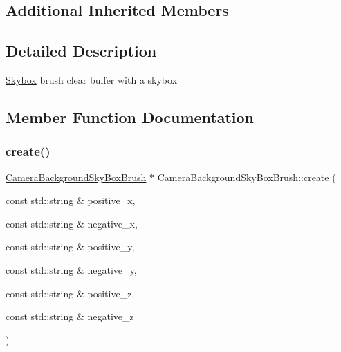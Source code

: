 \subsection*{Additional Inherited Members}


\subsection{Detailed Description}
\hyperlink{classSkybox}{Skybox} brush clear buffer with a skybox 

\subsection{Member Function Documentation}
\mbox{\label{classCameraBackgroundSkyBoxBrush_ae2e5e6ebefef131e1b4cb96d56be118e}} 
\subsubsection{\texorpdfstring{create()}{create()}\hspace{0.1cm}{\footnotesize\ttfamily [1/4]}}
{\footnotesize\ttfamily \hyperlink{classCameraBackgroundSkyBoxBrush}{Camera\+Background\+Sky\+Box\+Brush} $\ast$ Camera\+Background\+Sky\+Box\+Brush\+::create (\begin{DoxyParamCaption}\item[{const std\+::string \&}]{positive\+\_\+x,  }\item[{const std\+::string \&}]{negative\+\_\+x,  }\item[{const std\+::string \&}]{positive\+\_\+y,  }\item[{const std\+::string \&}]{negative\+\_\+y,  }\item[{const std\+::string \&}]{positive\+\_\+z,  }\item[{const std\+::string \&}]{negative\+\_\+z }\end{DoxyParamCaption})\hspace{0.3cm}{\ttfamily [static]}}


